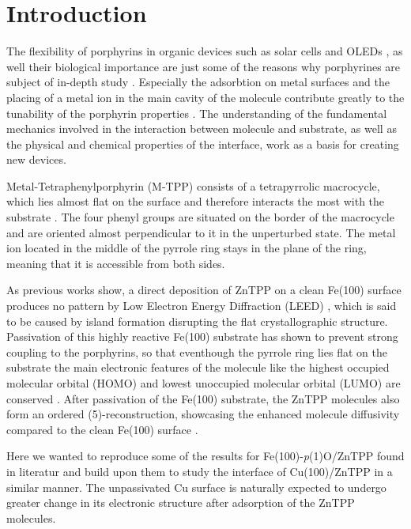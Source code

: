 \chapter{Introduction}
The flexibility of porphyrins in organic devices such as solar cells \cite*{schmidt-mende_zn-porphyrin-sensitized_2005} and OLEDs \cite*{graham_extended_2011}, as well their biological importance \cite*{dolphin_biochemical_1974} are just some of the reasons why porphyrines are subject of in-depth study \cite*{gottfried_surface_2015}.
Especially the adsorbtion on metal surfaces and the placing of a metal ion in the main cavity of the molecule contribute greatly to the tunability of the porphyrin properties \cite*{calloni_electron_2014}.
The understanding of the fundamental mechanics involved in the interaction between molecule and substrate, as well as the physical and chemical properties of the interface, work as a basis for creating new devices.

Metal-Tetraphenylporphyrin (M-TPP) consists of a tetrapyrrolic macrocycle, which lies almost flat on the surface and therefore interacts the most with the substrate \cite*{picone_local_2018}.
The four phenyl groups are situated on the border of the macrocycle and are oriented almost perpendicular to it in the unperturbed state.
The metal ion located in the middle of the pyrrole ring stays in the plane of the ring, meaning that it is accessible from both sides.

As previous works show, a direct deposition of ZnTPP on a clean Fe(100) surface produces no pattern by Low Electron Energy Diffraction (LEED) \cite*{bussetti_structure_2016}, which is said to be caused by island formation disrupting the flat crystallographic structure.
Passivation of this highly reactive Fe(100) substrate has shown to prevent strong coupling to the porphyrins, so that eventhough the pyrrole ring lies flat on the substrate the main electronic features of the molecule like the highest occupied molecular orbital (HOMO) and lowest unoccupied molecular orbital (LUMO) are conserved \cite*{picone_local_2018}.
After passivation of the Fe(100) substrate, the ZnTPP molecules also form an ordered (5)-reconstruction, showcasing the enhanced molecule diffusivity compared to the clean Fe(100) surface \cite*{bussetti_structure_2016}.

Here we wanted to reproduce some of the results for Fe(100)-\textit{p}(1)O/ZnTPP found in literatur \cite*{bussetti_filled_2016} and build upon them to study the interface of Cu(100)/ZnTPP in a similar manner.
The unpassivated Cu surface is naturally expected to undergo greater change in its electronic structure after adsorption of the ZnTPP molecules.